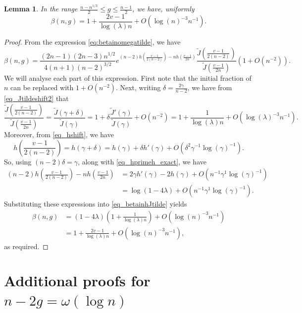 \documentclass[a4paper,12pt]{article}
\newtheorem{lemma}[theorem]{Lemma}
\theoremstyle{definition}
\newcommand{\largev}{\ensuremath{n-2g =\omega(\log n)}}
\newcommand{\bigO}[1]{O\left({#1}\right)}
\begin{document}
\begin{lemma}\label{lem_beta_high}
In the range $\frac{n-n^{1/3}}{2}\leq g \leq \frac{n-1}{2}$, we have, uniformly
    \[\beta(n,g)=1+\frac{2v-1}{\log(\lambda)n}+O(\log(n)^{-3} n^{-1}).\]
\end{lemma}
\begin{proof}
From the expression \eqref{eq:betainomegatilde}, we have
\begin{equation}\beta(n,g)=\frac{(2n-1)(2n-3)n^{1/2}}{4(n+1)(n-2)^{3/2}}e^{(n-2)h(\frac{v-1}{2(n-2)})-nh(\frac{v-1}{2n})}\frac{\tilde{J}\left(\frac{v-1}{2(n-2)}\right)}{\tilde{J}\left(\frac{v-1}{2n}\right)}\left(1+\bigO{n^{-2}}\right).\label{eq_betainhJtilde}\end{equation}
We will analyse each part of this expression. First note that the initial fraction of $n$ can be replaced with $1+\bigO{n^{-2}}$. Next, writing $\delta=\frac{2\gamma}{n-2}$, we have from \eqref{eq_Jtildeshift2} that
\[\frac{\tilde{J}\left(\frac{v-1}{2(n-2)}\right)}{\tilde{J}\left(\frac{v-1}{2n}\right)}=\frac{\tilde{J}\left(\gamma+\delta\right)}{\tilde{J}\left(\gamma\right)}=1+\delta\frac{\tilde{J}'(\gamma)}{\tilde{J}(\gamma)}+\bigO{n^{-2}}=1+\frac{1}{\log(\lambda)n}+\bigO{\log(\lambda)^{-3}n^{-1}}.\]
Moreover, from \eqref{eq_hshift}, we have
\[h\left(\frac{v-1}{2(n-2)}\right)=h(\gamma+\delta)=h(\gamma)+\delta h'(\gamma)+\bigO{\delta^{2}\gamma^{-1}\log(\gamma)^{-1}}.\]
So, using $(n-2)\delta=\gamma$, along with \eqref{eq_hprimeh_exact}, we have
\begin{align*}
(n-2)h\left(\frac{v-1}{2(n-2)}\right)-nh\left(\frac{v-1}{2n}\right)
&=2\gamma h'(\gamma)-2h(\gamma)+\bigO{n^{-1}\gamma^{1}\log(\gamma)^{-1}}\\
&=\log(1-4\lambda)+\bigO{n^{-1}\gamma^{1}\log(\gamma)^{-1}}.
\end{align*}
Substituting these expressions into \eqref{eq_betainhJtilde} yields
\begin{align*}
\beta(n,g)
&=\left(1-4\lambda\right)\left(1+\frac{1}{\log(\lambda)n}\right)+O(\log(n)^{-3} n^{-1})\\
&=1+\frac{2v-1}{\log(\lambda)n}+O(\log(n)^{-3} n^{-1}),    
\end{align*}
as required.

\end{proof}

\section{Additional proofs for \largev}
\end{document}
